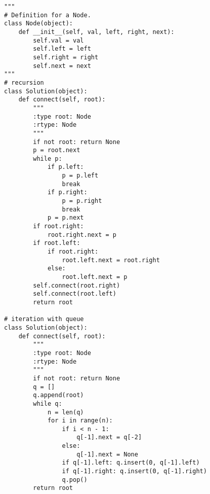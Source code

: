\begin{lstlisting}
"""
# Definition for a Node.
class Node(object):
    def __init__(self, val, left, right, next):
        self.val = val
        self.left = left
        self.right = right
        self.next = next
"""
# recursion
class Solution(object):
    def connect(self, root):
        """
        :type root: Node
        :rtype: Node
        """
        if not root: return None
        p = root.next
        while p:
            if p.left: 
                p = p.left
                break
            if p.right:
                p = p.right
                break
            p = p.next
        if root.right:
            root.right.next = p
        if root.left:
            if root.right:
                root.left.next = root.right
            else:
                root.left.next = p
        self.connect(root.right)
        self.connect(root.left)
        return root

# iteration with queue
class Solution(object):
    def connect(self, root):
        """
        :type root: Node
        :rtype: Node
        """
        if not root: return None
        q = []
        q.append(root)
        while q:
            n = len(q)
            for i in range(n):
                if i < n - 1:
                    q[-1].next = q[-2]
                else:
                    q[-1].next = None
                if q[-1].left: q.insert(0, q[-1].left)
                if q[-1].right: q.insert(0, q[-1].right)
                q.pop()
        return root
\end{lstlisting}

